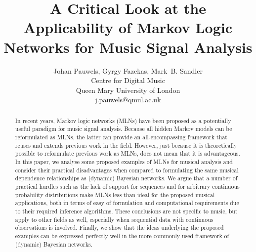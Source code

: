 \documentclass[letterpaper]{article} %
\title{A Critical Look at the Applicability of Markov Logic Networks for Music Signal Analysis}
\author{Johan Pauwels, Gyrgy Fazekas, Mark~B. Sandler\\ %
Centre for Digital Music\\
Queen Mary University of London\\
j.pauwels@qmul.ac.uk %
}
\begin{document}
\maketitle

\begin{abstract}
In recent years, Markov logic networks (MLNs) have been proposed as a potentially useful paradigm for music signal analysis. Because all hidden Markov models can be reformulated as MLNs, the latter can provide an all-encompassing framework that reuses and extends previous work in the field. However, just because it is theoretically possible to reformulate previous work as MLNs, does not mean that it is advantageous. In this paper, we analyse some proposed examples of MLNs for musical analysis and consider their practical disadvantages when compared to formulating the same musical dependence relationships as (dynamic) Bayesian networks. We argue that a number of practical hurdles such as the lack of support for sequences and for arbitrary continuous probability distributions make MLNs less than ideal for the proposed musical applications, both in terms of easy of formulation and computational requirements due to their required inference algorithms. These conclusions are not specific to music, but apply to other fields as well, especially when sequential data with continuous observations is involved. 
Finally, we show that the ideas underlying the proposed examples can be expressed perfectly well in the more commonly used framework of (dynamic) Bayesian networks.
\end{abstract}
\end{document}
